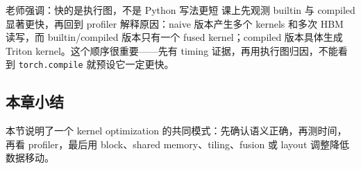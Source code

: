\begin{knowledgebox}{老师强调：快的是执行图，不是 Python 写法更短}
课上先观测 builtin 与 compiled 显著更快，再回到 profiler 解释原因：naive 版本产生多个 kernels 和多次 HBM 读写，而 builtin/compiled 版本只有一个 fused kernel；compiled 版本具体生成 Triton kernel。这个顺序很重要——先有 timing 证据，再用执行图归因，不能看到 \texttt{torch.compile} 就预设它一定更快。
\end{knowledgebox}
\subsection{本章小结}
本节说明了一个 kernel optimization 的共同模式：先确认语义正确，再测时间，再看 profiler，最后用 block、shared memory、tiling、fusion 或 layout 调整降低数据移动。

